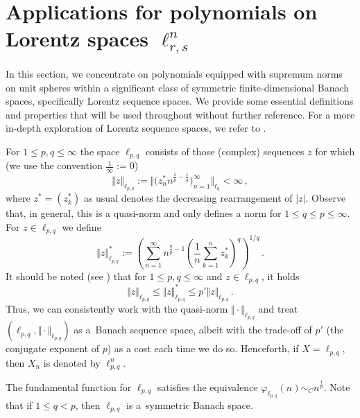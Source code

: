 \documentclass[12pt]{amsart}
\numberwithin{subsection}{section}
\theoremstyle{definition}
\theoremstyle{remark}
\begin{document}
\section{Applications for polynomials on Lorentz spaces $\ell_{r,s}^n$}

In this section, we concentrate on polynomials equipped with supremum norms on unit spheres within a significant class of symmetric
finite-dimensional Banach spaces, specifically Lorentz sequence spaces. We provide some essential definitions and properties that
will be used throughout without further reference. For a more in-depth exploration of Lorentz sequence spaces, we refer to
\cite{creekmore1981type, Jameson, LT1, Reisner}.

For $1 \leq p, q \leq \infty$ the space $\ell_{p,q}$ consists of those (complex) sequences $z$ for which (we use the convention $\frac{1}{\infty}:=0$)
\[
\Vert z \Vert_{\ell_{p,q}} := \Big\Vert \big( z^{*}_{n} n^{\frac{1}{p} - \frac{1}{q}} \big)_{n=1}^{\infty}  \Big\Vert_{\ell_{q}} < \infty\,,
\]
where $z^\ast = (z_k^\ast) $ as usual denotes the decreasing rearrangement of $|z|$.
Observe that, in general, this is a quasi-norm and only defines a norm for \( 1 \le q \le p \le \infty \). For $z \in \ell_{p,q}$ we define
\[
\Vert z \Vert_{\ell_{p,q}}^* := \left( \sum_{n=1}^\infty n^{\frac{q}{p} -1} \left( \frac{1}{n} \sum_{k=1}^n z_k^* \right)^q  \right)^{1/q}\,.
\]
It should be noted (see \cite[Lemma~4.5]{bennett1988interpolation}) that for $1 \le p,q \le \infty$ and $z \in \ell_{p,q}$, it holds
\begin{equation*}\label{eq: equivalencia normas ell_p,q}
\Vert z \Vert_{\ell_{p,q}} \le \Vert z \Vert_{\ell_{p,q}}^* \le p' \Vert z \Vert_{\ell_{p,q}}\,.
\end{equation*}
Thus, we can consistently work with the quasi-norm $\Vert \cdot \Vert_{\ell_{p,q}}$ and treat $(\ell_{p,q}, \Vert \cdot \Vert_{\ell_{p,q}})$
as a~Banach sequence space, albeit with the trade-off of $p'$ (the conjugate exponent of $p$) as a cost each time we do so. Henceforth, if
$X = \ell_{p,q}$, then $X_n$ is denoted by $\ell_{p,q}^n$.

The fundamental function for $\ell_{p,q}$ satisfies the equivalence $\varphi_{\ell_{p,q}}(n) \sim_C n^{\frac{1}{p}}$. Note that if
$1\leq q<p$, then $\ell_{p, q}$ is a~symmetric Banach space.
\end{document}
